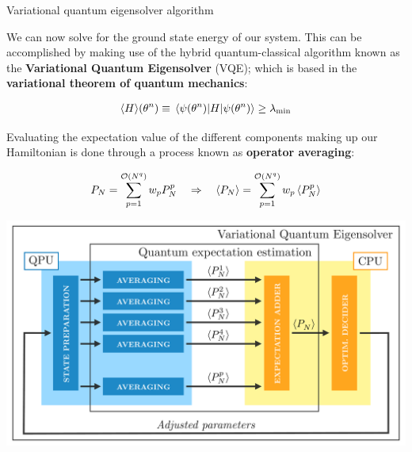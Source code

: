 \documentclass[9pt, handout, aspectratio=169]{beamer}	%
\begin{document}
\begin{frame}[allowframebreaks]{Variational quantum eigensolver algorithm}

	We can now solve for the ground state energy of our system. This can be accomplished by making use of the hybrid quantum-classical algorithm known as the \textbf{Variational Quantum Eigensolver} (VQE); which is based in the \textbf{variational theorem of quantum mechanics}:

	\begin{gather*}
	  \ev{H}\!\qty(\theta^{n}) \equiv
	    \ev{H}{\psi\qty(\theta^{n})} \geq
	    \lambda_{\text{min}}
	\end{gather*}

	Evaluating the expectation value of the different components making up our Hamiltonian is done through a process known as \textbf{operator averaging}:

	\begin{gather*}
	  P_{N} = \sum_{p=1}^{\order{N^q}} w_{p} P_{N}^{p} \qRa
	  \ev{P_{N}} = \sum_{p=1}^{\order{N^q}} w_{p} \ev{P_{N}^{p}}
	\end{gather*}

\break

	\begin{center}
		\includegraphics[width=.7\paperwidth]{Figures/NJL1-model-solving/VQE}
	\end{center}

\end{frame}

\end{document}

